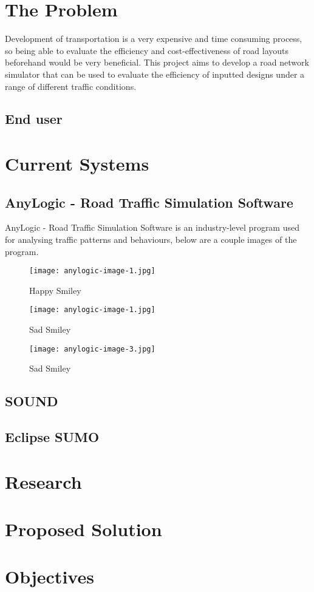 \section{The Problem}

    Development of transportation is a very expensive and time consuming process, so being able to evaluate the efficiency and cost-effectiveness of road layouts beforehand would be very beneficial. This project aims to develop a road network simulator that can be used to evaluate the efficiency of inputted designs under a range of different traffic conditions.

    \subsection{End user}

\section{Current Systems}

    \subsection{AnyLogic - Road Traffic Simulation Software}

        AnyLogic - Road Traffic Simulation Software \cite{AnyLogic} is an industry-level program used for analysing traffic patterns and behaviours, below are a couple images of the program.

        \begin{figure}[ht]
            \centering
            \begin{minipage}{0.3\textwidth}
                \texttt{[image: anylogic-image-1.jpg]}
                \caption{Happy Smiley}
            \end{minipage}
            \begin{minipage}{0.3\textwidth}
                \texttt{[image: anylogic-image-1.jpg]}
                \caption{Sad Smiley}
            \end{minipage}
            \begin{minipage}{0.3\textwidth}
                \texttt{[image: anylogic-image-3.jpg]}
                \caption{Sad Smiley}
            \end{minipage}
        \end{figure}

    \subsection{SOUND}

    \subsection{Eclipse SUMO}

\section{Research}

\section{Proposed Solution}

\section{Objectives}
